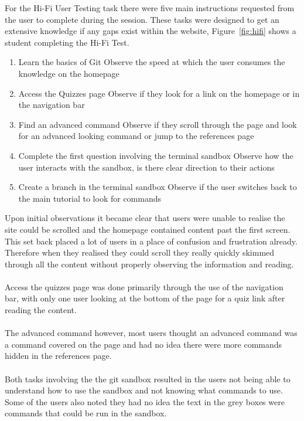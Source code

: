 For the Hi-Fi User Testing task there were five main instructions requested from the user to complete during the session. These tasks were designed to get an extensive knowledge if any gaps exist within the website, Figure~\ref{fig:hifi} shows a student completing the Hi-Fi Test.\\
\begin{enumerate}
	\item Learn the basics of Git
	\subitem Observe the speed at which the user consumes the knowledge on the homepage
	\item Access the Quizzes page
	\subitem Observe if they look for a link on the homepage or in the navigation bar
	\item Find an advanced command
	\subitem Observe if they scroll through the page and look for an advanced looking command or jump to the references page
	\item Complete the first question involving the terminal sandbox
	\subitem Observe how the user interacts with the sandbox, is there clear direction to their actions
	\item Create a branch in the terminal sandbox
	\subitem Observe if the user switches back to the main tutorial to look for commands
\end{enumerate}\vspace{1em}
Upon initial observations it became clear that users were unable to realise the site could be scrolled and the homepage contained content past the first screen. This set back placed a lot of users in a place of confusion and frustration already. Therefore when they realised they could scroll they really quickly skimmed through all the content without properly observing the information and reading.\\\\
Access the quizzes page was done primarily through the use of the navigation bar, with only one user looking at the bottom of the page for a quiz link after reading the content.\\\\
The advanced command however, most users thought an advanced command was a command covered on the page and had no idea there were more commands hidden in the references page.\\\\
Both tasks involving the the \gls{git} sandbox resulted in the users not being able to understand how to use the sandbox and not knowing what commands to use. Some of the users also noted they had no idea the text in the grey boxes were commands that could be run in the sandbox.

